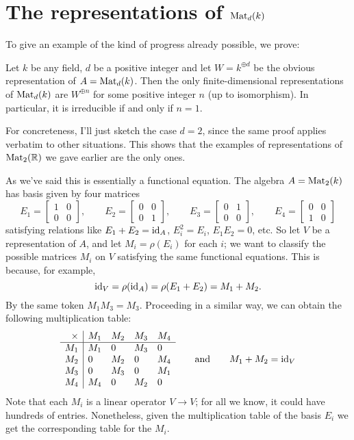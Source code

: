 \section{The representations of $\mathrm{Mat}_d(k)$}
To give an example of the kind of progress already possible, we prove:
\begin{theorem}
	\label{thm:rep_1mat}
	Let $k$ be any field, $d$ be a positive integer and
	let $W = k^{\oplus d}$ be the obvious representation of $A = \mathrm{Mat}_d(k)$.
	Then the only finite-dimensional representations
	of $\mathrm{Mat}_d(k)$ are $W^{\oplus n}$
	for some positive integer $n$ (up to isomorphism).
	In particular, it is irreducible if and only if $n=1$.
\end{theorem}
For concreteness, I'll just sketch the case $d=2$,
since the same proof applies verbatim to other situations.
This shows that the examples of representations of $\mathrm{Mat}_2(\mathbb R)$
we gave earlier are the only ones.

As we've said this is essentially a functional equation.
The algebra $A = \mathrm{Mat}_2(k)$ has basis given by four matrices
\[
	E_1 = \begin{bmatrix} 1 & 0 \\ 0 & 0 \end{bmatrix},
	\qquad
	E_2 = \begin{bmatrix} 0 & 0 \\ 0 & 1 \end{bmatrix},
	\qquad
	E_3 = \begin{bmatrix} 0 & 1 \\ 0 & 0 \end{bmatrix},
	\qquad
	E_4 = \begin{bmatrix} 0 & 0 \\ 1 & 0 \end{bmatrix}
\]
satisfying relations like $E_1 + E_2 = \mathrm{id}_A$, $E_i^2 = E_i$, $E_1E_2 = 0$, etc.
So let $V$ be a representation of $A$, and let $M_i = \rho(E_i)$ for each $i$;
we want to classify the possible matrices $M_i$ on $V$
satisfying the same functional equations.
This is because, for example,
\[ \mathrm{id}_V = \rho(\mathrm{id}_A) = \rho(E_1+E_2) = M_1 + M_2. \]
By the same token $M_1M_3 = M_3$.
Proceeding in a similar way, we can obtain the following multiplication table:
\[
	\begin{array}{r|llll}
		\times & M_1 & M_2 & M_3 & M_4 \\ \hline
		M_1 & M_1 & 0 & M_3 & 0 \\
		M_2 & 0 & M_2 & 0 & M_4 \\
		M_3 & 0 & M_3 & 0 & M_1 \\
		M_4 & M_4 & 0 & M_2 & 0
	\end{array}
	\qquad \text{and} \qquad
	M_1 + M_2 = \mathrm{id}_V
\]
Note that each $M_i$ is a linear operator $V \to V$;
for all we know, it could have hundreds of entries.
Nonetheless, given the multiplication table of the basis $E_i$
we get the corresponding table for the $M_i$.

